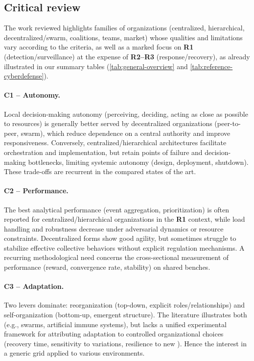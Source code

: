 \subsection{Critical review}
\label{sec:soa-critical-review}

The work reviewed highlights families of organizations (centralized, hierarchical, decentralized/swarm, coalitions, teams, market) whose qualities and limitations vary according to the criteria, as well as a marked focus on \textbf{R1} (detection/surveillance) at the expense of \textbf {R2--R3} (response/recovery), as already illustrated in our summary tables (\autoref{tab:general-overview} and \autoref{tab:reference-cyberdefense}).

\paragraph{C1 -- Autonomy.}
Local decision-making autonomy (perceiving, deciding, acting as close as possible to resources) is generally better served by decentralized organizations (peer-to-peer, swarm), which reduce dependence on a central authority and improve responsiveness. Conversely, centralized/hierarchical architectures facilitate orchestration and implementation, but retain points of failure and decision-making bottlenecks, limiting systemic autonomy (design, deployment, shutdown). These trade-offs are recurrent in the compared states of the art.

\paragraph{C2 -- Performance.}
The best analytical performance (event aggregation, prioritization) is often reported for centralized/hierarchical organizations in the \textbf{R1} context, while load handling and robustness decrease under adversarial dynamics or resource constraints. Decentralized forms show good agility, but sometimes struggle to stabilize effective collective behaviors without explicit regulation mechanisms. A recurring methodological need concerns the cross-sectional measurement of performance (reward, convergence rate, stability) on shared benches.

\paragraph{C3 -- Adaptation.}
Two levers dominate: reorganization (top-down, explicit roles/relationships) and self-organization (bottom-up, emergent structure). The literature illustrates both (e.g., swarms, artificial immune systems), but lacks a unified experimental framework for attributing adaptation to controlled organizational choices (recovery time, sensitivity to variations, resilience to new ). Hence the interest in a generic grid applied to various environments.

